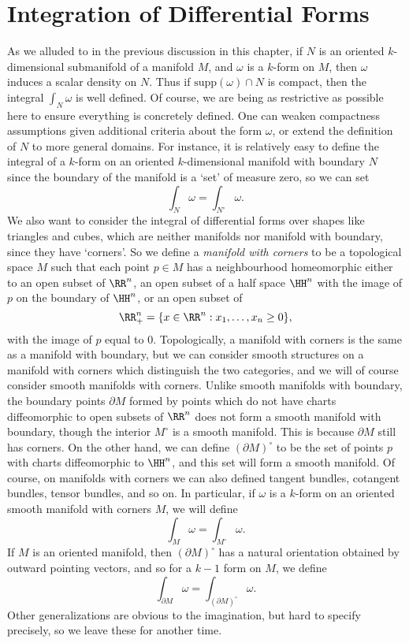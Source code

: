 \section{Integration of Differential Forms}

As we alluded to in the previous discussion in this chapter, if $N$ is an oriented $k$-dimensional submanifold of a manifold $M$, and $\omega$ is a $k$-form on $M$, then $\omega$ induces a scalar density on $N$. Thus if $\text{supp}(\omega) \cap N$ is compact, then the integral $\int_N \omega$ is well defined. Of course, we are being as restrictive as possible here to ensure everything is concretely defined. One can weaken compactness assumptions given additional criteria about the form $\omega$, or extend the definition of $N$ to more general domains. For instance, it is relatively easy to define the integral of a $k$-form on an oriented $k$-dimensional manifold with boundary $N$ since the boundary of the manifold is a `set' of measure zero, so we can set
%
\[ \int_N \omega = \int_{N^\circ} \omega. \]
%
We also want to consider the integral of differential forms over shapes like triangles and cubes, which are neither manifolds nor manifold with boundary, since they have `corners'. So we define a \emph{manifold with corners} to be a topological space $M$ such that each point $p \in M$ has a neighbourhood homeomorphic either to an open subset of $\RR^n$, an open subset of a half space $\HH^n$ with the image of $p$ on the boundary of $\HH^n$, or an open subset of
%
\[ \RR^n_+ = \{ x \in \RR^n: x_1, \dots, x_n \geq 0 \}, \]
%
with the image of $p$ equal to $0$. Topologically, a manifold with corners is the same as a manifold with boundary, but we can consider smooth structures on a manifold with corners which distinguish the two categories, and we will of course consider smooth manifolds with corners. Unlike smooth manifolds with boundary, the boundary points $\partial M$ formed by points which do not have charts diffeomorphic to open subsets of $\RR^n$ does not form a smooth manifold with boundary, though the interior $M^\circ$ is a smooth manifold. This is because $\partial M$ still has corners. On the other hand, we can define $(\partial M)^\circ$ to be the set of points $p$ with charts diffeomorphic to $\HH^n$, and this set will form a smooth manifold. Of course, on manifolds with corners we can also defined tangent bundles, cotangent bundles, tensor bundles, and so on. In particular, if $\omega$ is a $k$-form on an oriented smooth manifold with corners $M$, we will define
%
\[ \int_M \omega = \int_{M^\circ} \omega. \]
%
If $M$ is an oriented manifold, then $(\partial M)^\circ$ has a natural orientation obtained by outward pointing vectors, and so for a $k-1$ form on $M$, we define
%
\[ \int_{\partial M} \omega = \int_{(\partial M)^\circ} \omega. \]
%
Other generalizations are obvious to the imagination, but hard to specify precisely, so we leave these for another time.


